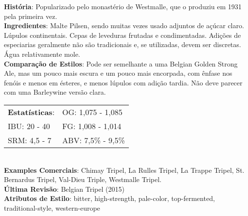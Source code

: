 \textbf{História}: Popularizado pelo monastério de Westmalle, que o produziu em 1931 pela primeira vez. \\
\textbf{Ingredientes}: Malte Pilsen, sendo muitas vezes usado adjuntos de açúcar claro. Lúpulos continentais. Cepas de leveduras frutadas e condimentadas. Adições de especiarias geralmente não são tradicionais e, se utilizadas, devem ser discretas. Água relativamente mole. \\
\textbf{Comparação de Estilos}: Pode ser semelhante a uma Belgian Golden Strong Ale, mas um pouco mais escura e um pouco mais encorpada, com ênfase nos fenóis e menos em ésteres, e menos lúpulos com adição tardia. Não deve parecer com uma Barleywine versão clara. \\
\begin{tabular}{@{}p{35mm}p{35mm}@{}}
  \textbf{Estatísticas}: & OG: 1,075 - 1,085 \\
  IBU: 20 - 40  & FG: 1,008 - 1,014  \\
  SRM: 4,5 - 7  & ABV: 7,5\% - 9,5\%
\end{tabular}\\
\textbf{Examples Comerciais}: Chimay Tripel, La Rulles Tripel, La Trappe Tripel, St. Bernardus Tripel, Val-Dieu Triple, Westmalle Tripel. \\
\textbf{Última Revisão}: Belgian Tripel (2015) \\
\textbf{Atributos de Estilo}: bitter, high-strength, pale-color, top-fermented, traditional-style, western-europe

